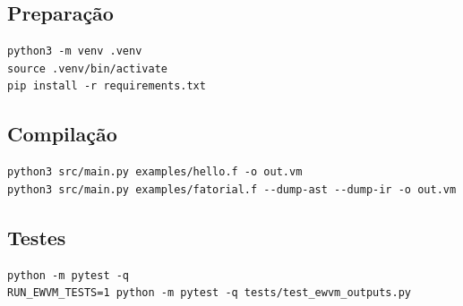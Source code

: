 \documentclass{article}
\begin{document}
\subsection{Preparação}
\begin{verbatim}
python3 -m venv .venv
source .venv/bin/activate
pip install -r requirements.txt
\end{verbatim}

\subsection{Compilação}
\begin{verbatim}
python3 src/main.py examples/hello.f -o out.vm
python3 src/main.py examples/fatorial.f --dump-ast --dump-ir -o out.vm
\end{verbatim}

\subsection{Testes}
\begin{verbatim}
python -m pytest -q
RUN_EWVM_TESTS=1 python -m pytest -q tests/test_ewvm_outputs.py
\end{verbatim}
\end{document}
